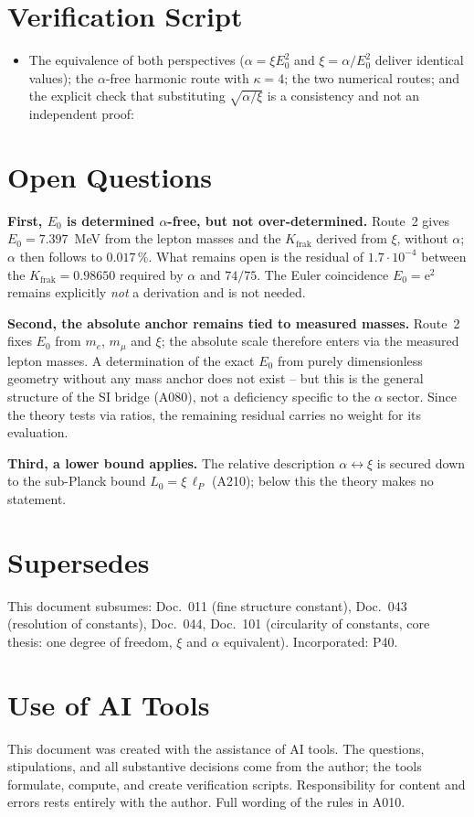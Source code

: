 \section{Verification Script}

\begin{itemize}
  \item The equivalence of both perspectives ($\alpha = \xi E_0^2$ and
    $\xi = \alpha/E_0^2$ deliver identical values); the $\alpha$-free
    harmonic route with $\kappa = 4$; the two numerical routes; and the explicit
    check that substituting $\sqrt{\alpha/\xi}$ is a consistency and not an
    independent proof:
\end{itemize}

\section{Open Questions}

\textbf{First, $E_0$ is determined $\alpha$-free, but not over-determined.}
Route~2 gives $E_0 = 7{.}397$~MeV from the lepton masses and the $K_\text{frak}$
derived from $\xi$, without $\alpha$; $\alpha$ then follows to $0{.}017\,\%$. What
remains open is the residual of $1{.}7\cdot10^{-4}$ between the $K_\text{frak} = 0{.}98650$
required by $\alpha$ and $74/75$. The Euler coincidence $E_0 = \mathrm{e}^2$ remains
explicitly \emph{not} a derivation and is not needed.

\textbf{Second, the absolute anchor remains tied to measured masses.} Route~2 fixes
$E_0$ from $m_e$, $m_\mu$ and $\xi$; the absolute scale therefore enters via the
measured lepton masses. A determination of the exact $E_0$ from purely dimensionless
geometry without any mass anchor does not exist -- but this is the general structure
of the SI bridge (A080), not a deficiency specific to the $\alpha$ sector. Since
the theory tests via ratios, the remaining residual carries no weight for its
evaluation.

\textbf{Third, a lower bound applies.} The relative description
$\alpha \leftrightarrow \xi$ is secured down to the sub-Planck bound $L_0 = \xi\,\ell_P$
(A210); below this the theory makes no statement.

\section{Supersedes}

This document subsumes: Doc.~011 (fine structure constant), Doc.~043 (resolution
of constants), Doc.~044, Doc.~101 (circularity of constants, core thesis: one
degree of freedom, $\xi$ and $\alpha$ equivalent). Incorporated: P40.

\section{Use of AI Tools}

This document was created with the assistance of AI tools. The questions,
stipulations, and all substantive decisions come from the author; the tools
formulate, compute, and create verification scripts.
Responsibility for content and errors rests entirely with the author.
Full wording of the rules in A010.
